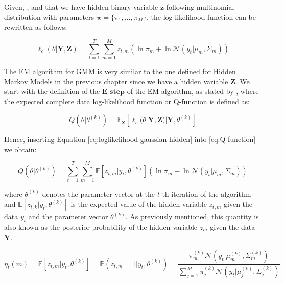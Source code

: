Given, \citep{Pandolfi2021}, and that we have hidden binary variable $\textbf{z}$ following multinomial distribution with parameters $\boldsymbol{\pi} = \{\pi_1,\ldots,\pi_M\}$, the log-likelihood function can be rewritten as follows:

\begin{equation} \label{eq:loglikelihood-gaussian-hidden}
    \ell_c(\theta|\textbf{Y},\textbf{Z}) = \sum_{t=1}^{T} \sum_{m=1}^{M} z_{t,m} \left(\ln \pi_m + \ln \mathcal{N}(y_t|\mu_m,\Sigma_m)\right)
\end{equation}

The EM algorithm for GMM is very similar to the one defined for Hidden Markov Models in the previous chapter since we have a hidden variable $\textbf{Z}$. 
We start with the definition of the $\textbf{E-step}$ of the EM algorithm, as stated by \citep{Sahu2020}, where the expected complete 
data log-likelihood function or Q-function is defined as:

\begin{equation} \label{eq:Q-function} 
    Q(\theta|\theta^{(k)}) = \mathbb{E}_{\textbf{Z}}[\ell_c(\theta|\textbf{Y},\textbf{Z})|\textbf{Y},\theta^{(k)}]
\end{equation}

\noindent Hence, inserting Equation \ref{eq:loglikelihood-gaussian-hidden} into \ref{eq:Q-function} we obtain:

\begin{equation}
    Q(\theta|\theta^{(k)}) = \sum_{t=1}^{T} \sum_{m=1}^{M} \mathbb{E}[z_{t,m}|y_t,\theta^{(k)}] \left(\ln \pi_m + \ln \mathcal{N}(y_t|\mu_m,\Sigma_m)\right)
\end{equation}

where $\theta^{(k)}$ denotes the parameter vector at the $t$-th iteration of the algorithm and $\mathbb{E}[z_{t,k}|y_t,\theta^{(k)}]$ is the expected value of the hidden variable $z_{t,m}$ given the data $y_t$ and the parameter vector $\theta^{(k)}$. As previously mentioned, this quantity is also known as the posterior probability of the hidden variable $z_{m}$ given the data $\textbf{Y}$.

\begin{equation} \label{eq:posterior_prob}
    \eta_t(m) = \mathbb{E}[z_{t,m}|y_t,\theta^{(k)}] = \mathbb{P}(z_{t,m} = 1|y_t,\theta^{(k)}) = \frac{\pi_m^{(k)} \mathcal{N}(y_t|\mu_m^{(k)},\Sigma_m^{(k)})}{\sum_{j=1}^{M} \pi_j^{(k)} \mathcal{N}(y_t|\mu_j^{(k)},\Sigma_j^{(k)})}
\end{equation}

